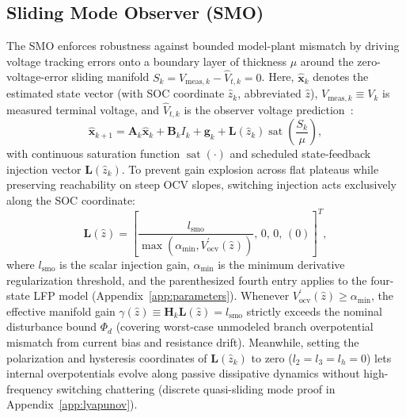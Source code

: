 \documentclass[10pt,a4paper]{article}
\begin{document}
\subsection{Sliding Mode Observer (SMO)}
The SMO enforces robustness against bounded model-plant mismatch by driving voltage tracking errors onto a boundary layer of thickness $\mu$ around the zero-voltage-error sliding manifold $S_k = V_{\text{meas},k} - \hat{V}_{t,k} = 0$. Here, $\hat{\mathbf{x}}_k$ denotes the estimated state vector (with SOC coordinate $\hat{z}_k$, abbreviated $\hat{z}$), $V_{\text{meas},k} \equiv V_k$ is measured terminal voltage, and $\hat{V}_{t,k}$ is the observer voltage prediction~\cite{Chen2016smo,Huangfu2018smo}:
\begin{equation}\label{eqn:smo_state_eq}
\hat{\mathbf{x}}_{k+1} = \mathbf{A}_k \hat{\mathbf{x}}_k + \mathbf{B}_k I_k + \mathbf{g}_k + \mathbf{L}(\hat{z}_k) \operatorname{sat}\left( \frac{S_k}{\mu} \right),
\end{equation}
with continuous saturation function $\operatorname{sat}(\cdot)$ and scheduled state-feedback injection vector $\mathbf{L}(\hat{z}_k)$. To prevent gain explosion across flat plateaus while preserving reachability on steep OCV slopes, switching injection acts exclusively along the SOC coordinate:
\begin{equation}
\mathbf{L}(\hat{z}) = \left[\frac{l_{\text{smo}}}{\max(\alpha_{\min}, V_{\text{ocv}}^\prime(\hat{z}))},\, 0,\, 0,\, (0)\right]^T,
\end{equation}
where $l_{\text{smo}}$ is the scalar injection gain, $\alpha_{\min}$ is the minimum derivative regularization threshold, and the parenthesized fourth entry applies to the four-state LFP model (Appendix~\ref{app:parameters}). Whenever $V_{\text{ocv}}^\prime(\hat{z}) \ge \alpha_{\min}$, the effective manifold gain $\gamma(\hat{z}) \equiv \mathbf{H}_k\mathbf{L}(\hat{z}) = l_{\text{smo}}$ strictly exceeds the nominal disturbance bound $\Phi_d$ (covering worst-case unmodeled branch overpotential mismatch from current bias and resistance drift). Meanwhile, setting the polarization and hysteresis coordinates of $\mathbf{L}(\hat{z}_k)$ to zero ($l_2 = l_3 = l_h = 0$) lets internal overpotentials evolve along passive dissipative dynamics without high-frequency switching chattering (discrete quasi-sliding mode proof in Appendix~\ref{app:lyapunov}).
\end{document}
